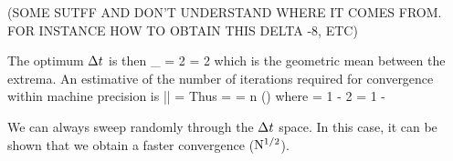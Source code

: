 \documentclass[11pt]{article}
\begin{document}
(SOME SUTFF AND DON'T UNDERSTAND WHERE IT COMES FROM. FOR INSTANCE HOW TO OBTAIN THIS DELTA -8, ETC)

The optimum $\Delta t$ is then
\beq
\dt_{} = 2 \nmax = 2\com
\eeq
which is the geometric mean between the extrema.  An estimative of the number of iterations
 required for convergence within machine precision is
 \beq
        \left|\right| = \per
 \eeq
    Thus
    \beq
    \log {} = \log {} = n \log()\com
    \eeq
    where
    \beq
        \epsilon = 1 - 2  = 1 - \per
    \eeq

    We can always sweep randomly through the $\Delta t$ space. In this case, it can be shown that we obtain a faster convergence ($\mathrm{N}^{1/2}$).
\end{document}
